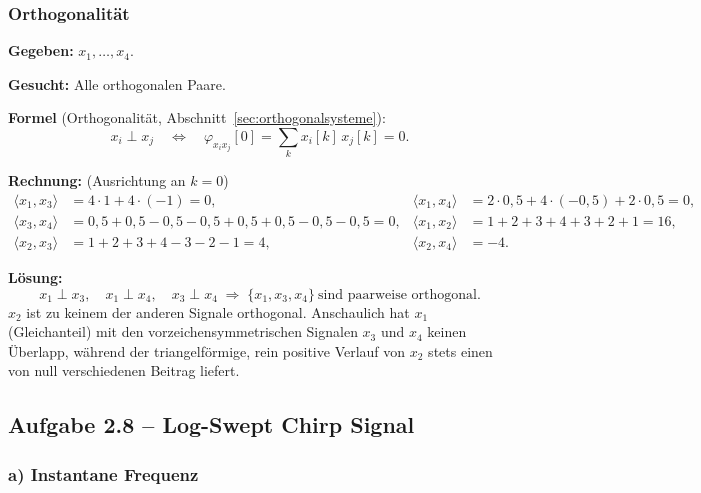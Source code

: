 \subsubsection*{Orthogonalität}

\begin{beispiel}

\textbf{Gegeben:} $x_1,\ldots,x_4$.

\textbf{Gesucht:} Alle orthogonalen Paare.

\textbf{Formel} (Orthogonalität, Abschnitt~\ref{sec:orthogonalsysteme}):
$$
x_i \perp x_j \quad\Longleftrightarrow\quad
\varphi_{x_i x_j}[0] = \sum_k x_i[k]\,x_j[k] = 0.
$$

\textbf{Rechnung:} (Ausrichtung an $k=0$)
$$
\begin{aligned}
\langle x_1,x_3\rangle &= 4\cdot 1 + 4\cdot(-1) = 0, &
\langle x_1,x_4\rangle &= 2\cdot 0{,}5 + 4\cdot(-0{,}5) + 2\cdot 0{,}5 = 0, \\
\langle x_3,x_4\rangle &= 0{,}5+0{,}5-0{,}5-0{,}5+0{,}5+0{,}5-0{,}5-0{,}5 = 0, &
\langle x_1,x_2\rangle &= 1+2+3+4+3+2+1 = 16, \\
\langle x_2,x_3\rangle &= 1+2+3+4-3-2-1 = 4, &
\langle x_2,x_4\rangle &= -4.
\end{aligned}
$$

\textbf{Lösung:}
$$
\boxed{\;x_1\perp x_3,\quad x_1\perp x_4,\quad x_3\perp x_4
\;\Rightarrow\; \{x_1,x_3,x_4\}\ \text{sind paarweise orthogonal.}\;}
$$
$x_2$ ist zu keinem der anderen Signale orthogonal. Anschaulich hat $x_1$
(Gleichanteil) mit den vorzeichensymmetrischen Signalen $x_3$ und $x_4$ keinen
Überlapp, während der triangelförmige, rein positive Verlauf von $x_2$ stets
einen von null verschiedenen Beitrag liefert.
\end{beispiel}

\subsection*{Aufgabe 2.8 – Log-Swept Chirp Signal}

\subsubsection*{a) Instantane Frequenz}

